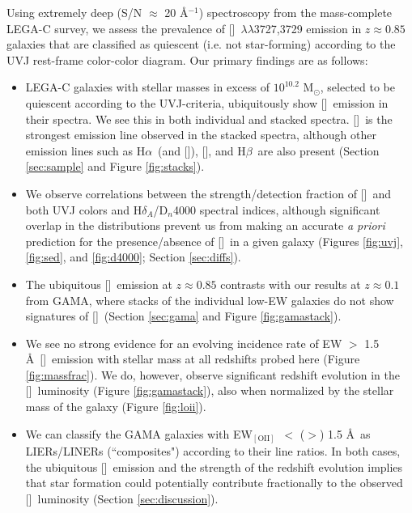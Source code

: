 \documentclass[twocolumn,natbib,iop,hyperref]{aastex62}
\newcommand{\msol}{M$_{\odot}$}
\newcommand{\nii}{[\ion{N}{2}]}
\newcommand{\hb}{H$\beta$}
\newcommand{\oiii}{[\ion{O}{3}]}
\newcommand{\oii}{[\ion{O}{2}]}
\newcommand{\ewoii}{EW$_{\mathrm{[O II]}}$}
\newcommand{\ha}{H$\alpha$}
\newcommand{\hda}{H$\delta_{A}$}
\begin{document}
Using extremely deep (S/N $\approx$ 20 \AA$^{-1}$) spectroscopy from the mass-complete LEGA-C survey, we assess the prevalence of \oii\ $\lambda\lambda$3727,3729 emission in $z \approx 0.85$ galaxies that are classified as quiescent (i.e. not star-forming) according to the UVJ rest-frame color-color diagram.  Our primary findings are as follows:
\begin{itemize}
\item LEGA-C galaxies with stellar masses in excess of $10^{10.2}$ \msol, selected to be quiescent according to the UVJ-criteria, ubiquitously show \oii\ emission in their spectra.  We see this in both individual and stacked spectra.  \oii\ is the strongest emission line observed in the stacked spectra, although other emission lines such as \ha\ (and \nii), \oiii, and \hb\ are also present (Section \ref{sec:sample} and Figure \ref{fig:stacks}).
\item We observe correlations between the strength/detection fraction of \oii\ and both UVJ colors and \hda/D$_n$4000 spectral indices, although significant overlap in the distributions prevent us from making an accurate \textit{a priori} prediction for the presence/absence of \oii\ in a given galaxy (Figures \ref{fig:uvj}, \ref{fig:sed}, and \ref{fig:d4000}; Section \ref{sec:diffs}).
\item The ubiquitous \oii\ emission at $z\approx0.85$ contrasts with our results at $z\approx0.1$ from GAMA, where stacks of the individual low-EW galaxies do not show signatures of \oii\ (Section \ref{sec:gama} and Figure \ref{fig:gamastack}).
\item We see no strong evidence for an evolving incidence rate of EW $>$ 1.5 \AA\ \oii\ emission with stellar mass at all redshifts probed here (Figure \ref{fig:massfrac}).  We do, however, observe significant redshift evolution in the \oii\ luminosity (Figure \ref{fig:gamastack}), also when normalized by the stellar mass of the galaxy (Figure \ref{fig:loii}).
\item We can classify the GAMA galaxies 
with \ewoii\ $<$ ($>$) 1.5 \AA\ as LIERs/LINERs (``composites") according to their line ratios.  In both cases, the ubiquitous \oii\ emission and the strength of the redshift evolution implies that star formation could potentially contribute fractionally to the observed \oii\ luminosity (Section \ref{sec:discussion}).
\end{itemize}
\end{document}
